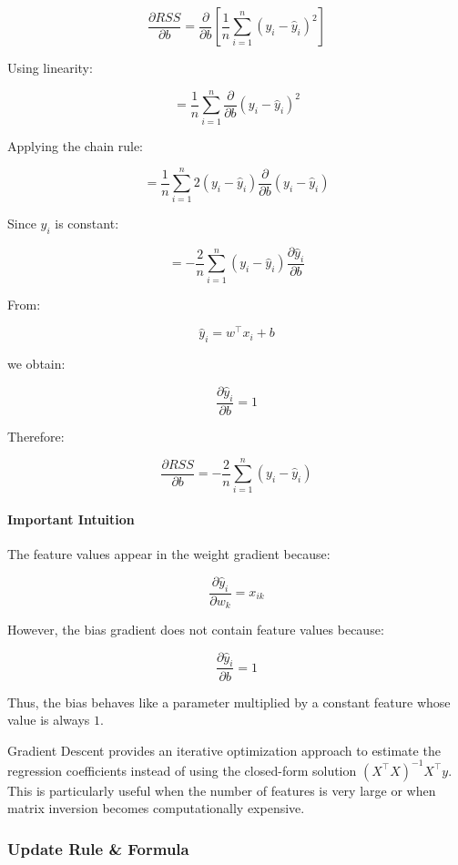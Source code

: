 \documentclass[10pt,a4paper]{article}
\begin{document}
	\[
	\frac{\partial RSS}{\partial b}
	=
	\frac{\partial}{\partial b}
	\left[
	\frac{1}{n}
	\sum_{i=1}^{n}
	(y_i - \hat{y}_i)^2
	\right]
	\]
	
	Using linearity:
	
	\[
	=
	\frac{1}{n}
	\sum_{i=1}^{n}
	\frac{\partial}{\partial b}
	(y_i - \hat{y}_i)^2
	\]
	
	Applying the chain rule:
	
	\[
	=
	\frac{1}{n}
	\sum_{i=1}^{n}
	2(y_i - \hat{y}_i)
	\frac{\partial}{\partial b}(y_i - \hat{y}_i)
	\]
	
	Since \(y_i\) is constant:
	
	\[
	=
	-\frac{2}{n}
	\sum_{i=1}^{n}
	(y_i - \hat{y}_i)
	\frac{\partial \hat{y}_i}{\partial b}
	\]
	
	From:
	
	\[
	\hat{y}_i = w^\top x_i + b
	\]
	
	we obtain:
	
	\[
	\frac{\partial \hat{y}_i}{\partial b} = 1
	\]
	
	Therefore:
	
	\[
	\boxed{
	\frac{\partial RSS}{\partial b}
	=
	-\frac{2}{n}
	\sum_{i=1}^{n}
	(y_i - \hat{y}_i)
	}
	\]
	
	\paragraph{Important Intuition}
	
	The feature values appear in the weight gradient because:
	
	\[
	\frac{\partial \hat{y}_i}{\partial w_k} = x_{ik}
	\]
	
	However, the bias gradient does not contain feature values because:
	
	\[
	\frac{\partial \hat{y}_i}{\partial b} = 1
	\]
	
	Thus, the bias behaves like a parameter multiplied by a constant feature whose value is always \(1\).
	
	Gradient Descent provides an iterative optimization approach to estimate the regression coefficients instead of using the closed-form solution $(X^\top X)^{-1}X^\top y$. This is particularly useful when the number of features is very large or when matrix inversion becomes computationally expensive.
	
	\subsubsection{Update Rule \& Formula}
\end{document}
